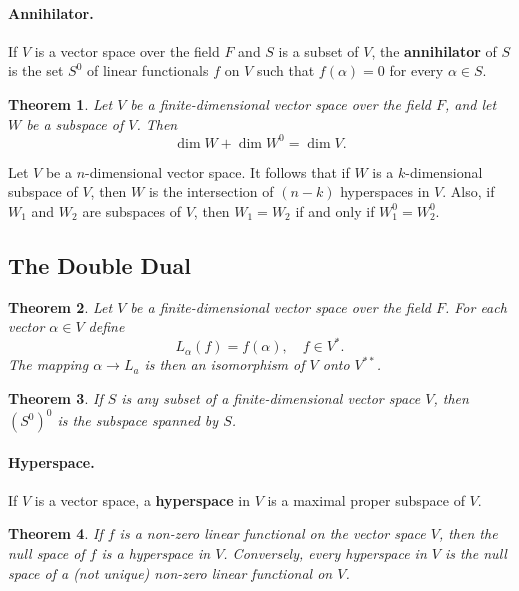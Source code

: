 \documentclass{article}
\newtheorem{theorem}{Theorem}[section]
\begin{document}
\paragraph{Annihilator.} If $V$ is a vector space over the field $F$ and $S$ is
a subset of $V$, the \textbf{annihilator} of $S$ is the set $S^0$ of linear
functionals $f$ on $V$ such that $f(\alpha) = 0$ for every $\alpha \in S$.

\begin{theorem}
  Let $V$ be a finite-dimensional vector space over the field $F$, and let $W$
  be a subspace of $V$. Then \[
    \dim W + \dim W^0 = \dim V.
  \]
\end{theorem}

Let $V$ be a $n$-dimensional vector space. It follows that if $W$ is a
$k$-dimensional subspace of $V$, then $W$ is the intersection of $(n - k)$
hyperspaces in $V$. Also, if $W_1$ and $W_2$ are subspaces of $V$, then $W_1 =
W_2$ if and only if $W_1^0 = W_2^0$.

\subsection{The Double Dual}

\begin{theorem}
  Let $V$ be a finite-dimensional vector space over the field $F$. For each
  vector $\alpha \in V$ define \[
    L_{\alpha}(f) = f(\alpha),\quad f \in V^*.
  \] The mapping $\alpha \to L_a$ is then an isomorphism of $V$ onto $V^{**}$.
\end{theorem}

\begin{theorem}
  If $S$ is any subset of a finite-dimensional vector space $V$, then $(S^0)^0$
  is the subspace spanned by $S$.
\end{theorem}

\paragraph{Hyperspace.} If $V$ is a vector space, a \textbf{hyperspace} in $V$
is a maximal proper subspace of $V$.

\begin{theorem}
  If $f$ is a non-zero linear functional on the vector space $V$, then the null
  space of $f$ is a hyperspace in $V$. Conversely, every hyperspace in $V$ is
  the null space of a (not unique) non-zero linear functional on $V$.
\end{theorem}
\end{document}
